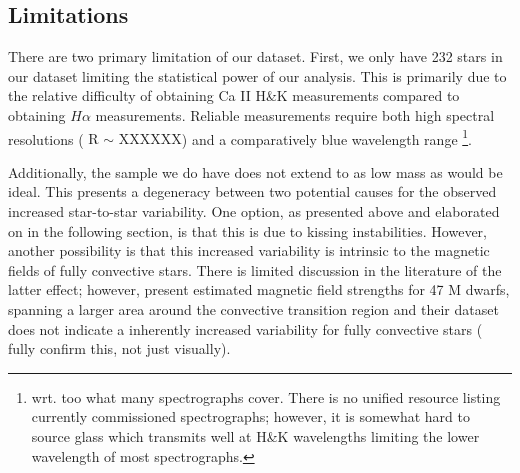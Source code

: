 \subsection{Limitations}
There are two primary limitation of our dataset. First, we only have
{\color{red}232 stars} in our dataset limiting the statistical power of our
analysis. This is primarily due to the relative difficulty of obtaining Ca II
H\&K measurements compared to obtaining $H\alpha$ measurements. Reliable
measurements require both high spectral resolutions ({\color{red} R $\sim$
XXXXXX}) and a comparatively blue wavelength range \footnote{wrt. too what many
spectrographs cover. There is no unified resource listing currently
commissioned spectrographs; however, it is somewhat hard to source glass which
transmits well at H\&K wavelengths limiting the lower wavelength of most
spectrographs.}.

Additionally, the sample we do have does not extend to as low mass as would be
ideal. This presents a degeneracy between two potential causes for the observed
increased star-to-star variability. One option, as presented above and
elaborated on in the following section, is that this is due to kissing
instabilities. However, another possibility is that this increased variability
is intrinsic to the magnetic fields of fully convective stars. There is limited
discussion in the literature of the latter effect; however, \citet{Shulyak2019}
present estimated magnetic field strengths for 47 M dwarfs, spanning a larger
area around the convective transition region and their dataset does not
indicate a inherently increased variability for fully convective stars
({\color{red} fully confirm this, not just visually}).
